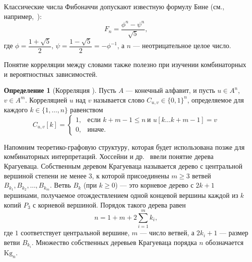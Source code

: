 \documentclass[a4paper,14pt]{extreport}
\theoremstyle{plain}
\theoremstyle{definition}
\newtheorem{definition}{Определение}[section]
\theoremstyle{remark}
\begin{document}
Классические числа Фибоначчи допускают известную формулу Бине (см., например,~\cite{knuth1997}):
\begin{equation}\label{eq4duaafib}
	F_n = \frac{\phi^n - \psi^n}{\sqrt{5}},
\end{equation}
где $\phi = \dfrac{1 + \sqrt{5}}{2}$, $\psi = \dfrac{1 - \sqrt{5}}{2} = -\phi^{-1}$, а $n$ --- неотрицательное целое число.

Понятие корреляции между словами также полезно при изучении комбинаторных и вероятностных зависимостей.

\begin{definition}[Корреляция {\cite{Rampersad2023Wiebe}}]\label{defCorrelation}
	Пусть $A$ --- конечный алфавит, и пусть $u \in A^n$, $v \in A^m$. Корреляцией $u$ над $v$ называется слово $C_{u,v} \in \{0,1\}^n$, определяемое для каждого $k \in \{1,\ldots,n\}$ равенством
	\begin{equation}
		C_{u,v}[k] = 
		\begin{cases}
			1, & \text{если } k+m-1\le n\ \text{и }u[k\ldots k+m-1]=v \\[1ex]
			0, & \text{иначе}.
		\end{cases}
	\end{equation}
\end{definition}

Напомним теоретико-графовую структуру, которая будет использована позже для комбинаторных интерпретаций. Хоссейни и др.~\cite{HosseiniGutmanAhmadi} ввели понятие дерева Крагуеваца. Собственным деревом Крагуеваца называется дерево с центральной вершиной степени не менее $3$, к которой присоединены $m \ge 3$ ветвей $B_{k_1},B_{k_2},\dots,B_{k_m}$. Ветвь $B_k$ (при $k \ge 0$) --- это корневое дерево с $2k+1$ вершинами, получаемое отождествлением одной концевой вершины каждой из $k$ копий $P_3$ с корневой вершиной. Порядок такого дерева равен
\begin{equation}
	n = 1 + m + 2 \sum_{i=1}^m k_i,
\end{equation}
где $1$ соответствует центральной вершине, $m$ --- число ветвей, а $2k_i+1$ --- размер ветви $B_{k_i}$. Множество собственных деревьев Крагуеваца порядка $n$ обозначается $\mathrm{Kg}_n$.
\end{document}
